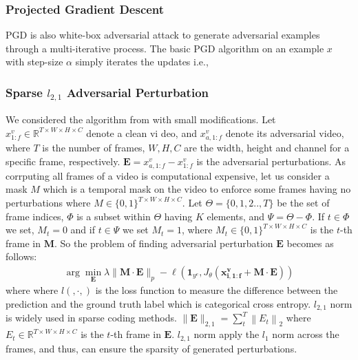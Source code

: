 \documentclass[10pt,twocolumn,letterpaper]{article}
\begin{document}
\subsubsection{Projected Gradient Descent}
PGD is also white-box adversarial attack to generate adversarial examples through a multi-iterative process. The basic PGD algorithm on an example $x$ with step-size $\alpha$ simply iterates the updates i.e.,

\subsubsection{Sparse $l_{2,1}$ Adversarial Perturbation}
We considered the algorithm from \cite{wei2018sparse} with small modifications. Let $x_{1:f}^v \in \mathbb{R}^{T \times W \times H \times C}$ denote a clean vi
deo, and $x_{a,{1:f}}^v$ denote its adversarial video, where $T$ is the number of frames, $W,H,C$ are the width, height and channel for a specific frame, respectively. $\mathbf{E} = x_{a,{1:f}}^v - x_{1:f}^v$ is the adversarial perturbations. As corrputing all frames of a video is computational expensive, let us consider a mask $M$ which is a temporal mask on the video to enforce some frames having no perturbations where $M \in \{0,1\}^{T \times W \times H \times C}$. Let $\Theta = \{0,1,2..,T\}$ be the set of frame indices, $\Phi$ is a subset within $\Theta$ having $K$ elements, and $\Psi = \Theta - \Phi$. If $t \in \Phi$ we set, $M_{t} = 0$ and if $t \in \Psi$ we set $M_{t} = 1$, where $M_{t} \in \{0,1\}^{T \times W \times H \times C}$ is the $t$-th frame in $\mathbf{M}$. So the problem of finding adversarial perturbation $\mathbf{E}$ becomes as follows:
\vspace{-0.5 em}
\begin{align}
\arg \min _{\mathbf{E}} \lambda\|\mathbf{M} \cdot \mathbf{E}\|_{p} -  \ell\left(\mathbf{1}_{y^{e}}, J_{\theta}\left(\mathbf{x_{i,{1:f}}^v}+\mathbf{M} \cdot \mathbf{E}\right)\right)
\end{align}
where where $l(,·,)$ is the loss function to measure the difference between the prediction and the ground truth label which is categorical cross entropy. $l_{2,1}$ norm is widely used in sparse coding methods. $\|\mathbf{E}\|_{2,1} = \sum_{t}^{T}\left\|E_{t}\right\|_{2}$ where $E_{t} \in \mathbb{R}^{T \times W \times H \times C}$ is the $t$-th frame in $\mathbf{E}$. $l_{2,1}$ norm apply the $l_{1}$ norm across the frames, and thus, can ensure the sparsity of generated perturbations. \\
\end{document}
